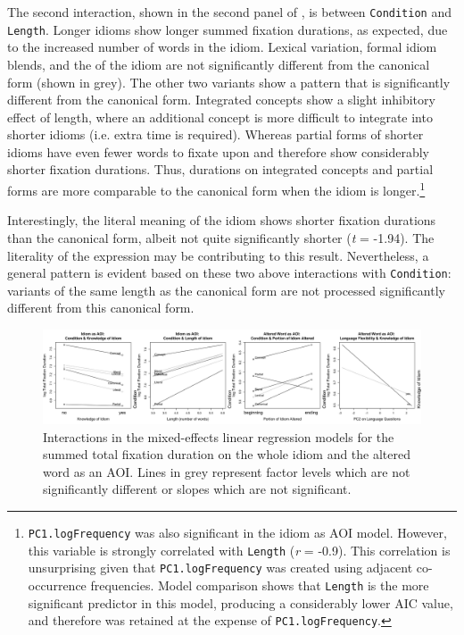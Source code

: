 \documentclass[output=paper,modfonts,nonflat]{langsci/langscibook}
\begin{document}
The second interaction, shown in the second panel of , is between \texttt{Condition} and \texttt{Length}. Longer idioms show longer summed fixation durations, as expected, due to the increased number of words in the idiom. Lexical variation, formal idiom blends, and the  of the idiom are not significantly different from the canonical form (shown in grey). The other two variants show a pattern that is significantly different from the canonical form. Integrated concepts show a slight inhibitory effect of length, where an additional concept is more difficult to integrate into shorter idioms (i.e. extra time is required). Whereas partial forms of shorter idioms have even fewer words to fixate upon and therefore show considerably shorter fixation durations. Thus, durations on integrated concepts and partial forms are more comparable to the canonical form when the idiom is longer.\footnote{\texttt{PC1.logFrequency} was also significant in the idiom as AOI model. However, this variable is strongly correlated with \texttt{Length} (\textit{r} = -0.9). This correlation is unsurprising given that \texttt{PC1.logFrequency} was created using adjacent co-occurrence frequencies. Model comparison shows that \texttt{Length} is the more significant predictor in this model, producing a considerably lower AIC value, and therefore was retained at the expense of \texttt{PC1.logFrequency}.}

Interestingly, the literal meaning of the idiom shows shorter fixation durations than the canonical form, albeit not quite significantly shorter (\textit{t} = -1.94). The literality of the expression \citep{TitoneConnine1994b} may be contributing to this result. Nevertheless, a general pattern is evident based on these two above interactions with \texttt{Condition}: variants of the same length as the canonical form are not processed significantly different from this canonical form.


\begin{figure}
\centering
\includegraphics[width=\textwidth]{figures/eyetracking.png}
\caption{Interactions in the mixed-effects linear regression models for the summed total fixation duration on the whole idiom and the altered word as an AOI. Lines in grey represent factor levels which are not significantly different or slopes which are not significant.}
\label{plotEyetracking}
\end{figure}
\end{document}
